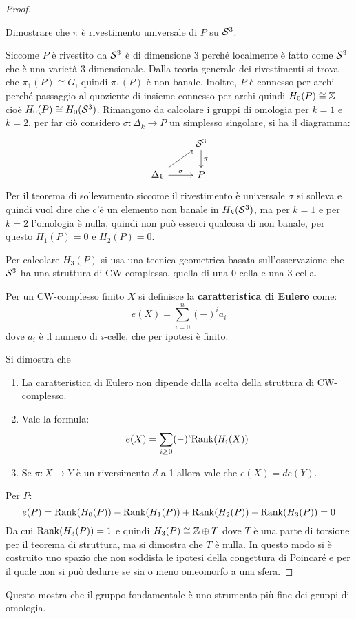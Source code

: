 \begin{proof}
  \begin{exercise}
    Dimostrare che $ \pi $ è rivestimento universale di $ P $ su $ \mathcal{S}^{3} $.
  \end{exercise}
  Siccome $ P $ è rivestito da $ \mathcal{S}^{3} $ è di dimensione 3 perché localmente è
  fatto come $ \mathcal{S}^{3} $ che è una varietà $ 3 $-dimensionale. Dalla teoria
  generale dei rivestimenti si trova che $ \pi_1(P) \cong G $, quindi
  $ \pi_1(P) $ è non banale. Inoltre, $ P $ è connesso per archi perché passaggio
  al quoziente di insieme connesso per archi quindi $ H_0(P) \cong \mathbb{Z} $ cioè
  $ H_0(P) \cong H_0(\mathcal{S}^{3}) $. Rimangono da calcolare i gruppi di omologia per
  $ k = 1 $ e $ k = 2 $, per far ciò considero $ \sigma \colon \Delta_k \to P $ un simplesso
  singolare, si ha il diagramma:
  \[
    \begin{tikzcd}
      {} & \Sph{3} \dar{\pi} \\
      \Delta_k \rar{\sigma} \arrow{ru}{} & P
    \end{tikzcd}
  \]
  Per il teorema di sollevamento siccome il rivestimento è universale
  $ \sigma $ si solleva e quindi vuol dire che c'è un elemento non banale in $ H_k(\mathcal{S}^{3}) $,
  ma per $ k = 1 $ e per $ k = 2 $ l'omologia è nulla, quindi non può esserci
  qualcosa di non banale, per questo $ H_1(P) = 0 $ e $ H_2(P) = 0 $.

  Per calcolare $ H_3(P) $ si usa una tecnica geometrica basata
  sull'osservazione che $ \mathcal{S}^{3} $ ha una struttura di CW-complesso, quella di
  una $ 0 $-cella e una $ 3 $-cella.

  \begin{definition}
    Per un CW-complesso finito $ X $ si definisce la \textbf{caratteristica di Eulero}
    come:
    \[
      e(X) = \sum_{i = 0}^n (-)^i a_i
    \]
    dove $ a_i $ è il numero di $ i $-celle, che per ipotesi è finito.
  \end{definition}
  Si dimostra che
  \begin{enumerate}
  \item La caratteristica di Eulero non dipende dalla scelta della struttura
    di CW-complesso.
  \item Vale la formula:
    \[
      e(X) = \sum_{i\geq0}(-)^i \mathrm{Rank}( H_i(X) )
    \]
  \item Se $ \pi \colon X \to Y $ è un riversimento $ d $ a 1 allora vale che $ e(X) = d e(Y) $.
  \end{enumerate}
  Per $ P $:
  \[
    e(P) = \mathrm{Rank}( H_0(P) ) - \mathrm{Rank}( H_1(P) ) + \mathrm{Rank}( H_2(P) ) - \mathrm{Rank}( H_3(P) ) = 0
  \]
  Da cui $ \mathrm{Rank}( H_3(P) ) = 1 $ e quindi $ H_3(P) \cong \mathbb{Z} \oplus T $ dove $ T $ è una
  parte di torsione per il teorema di struttura, ma si dimostra che $ T $ è
  nulla. In questo modo si è costruito uno spazio che non soddisfa le ipotesi
  della congettura di Poincaré e per il quale non si può dedurre se sia o meno
  omeomorfo a una sfera.
\end{proof}
\eproof
Questo mostra che il gruppo fondamentale è uno strumento più fine
dei gruppi di omologia.

